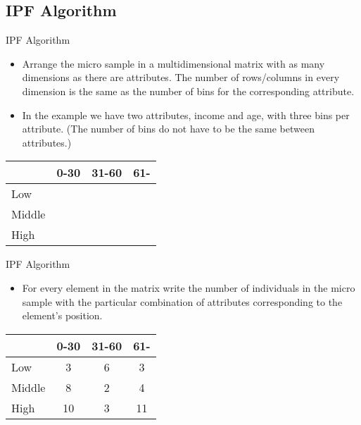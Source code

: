 \documentclass{beamer}
\begin{document}
\subsection{IPF Algorithm}
\begin{frame}{IPF Algorithm}
\begin{itemize}
\item Arrange the micro sample in a multidimensional matrix with as
  many dimensions as there are attributes. The number of rows/columns
  in every dimension is the same as the number of bins for the
  corresponding attribute.
\item In the example we have two attributes, income and age, with
  three bins per attribute. (The number of bins do not have to be the
  same between attributes.)
\end{itemize}

\begin{table}
\centering
\begin{tabular}{l||c c c}
      & 0-30 & 31-60 & 61-\\
\hline \hline
Low   & & & \\
Middle& & & \\
High  & & & \\
\end{tabular}
\end{table}
\end{frame}


\begin{frame}{IPF Algorithm}
\begin{itemize}
\item For every element in the matrix write the number of individuals
  in the micro sample with the particular combination of attributes
  corresponding to the element's position.
\end{itemize}

\begin{table}
\centering
\begin{tabular}{l||c c c}
      & 0-30 & 31-60 & 61- \\
\hline \hline
Low   &  3 &  6 &  3 \\
Middle&  8 &  2 &  4 \\
High  & 10 &  3 & 11 \\
\end{tabular}
\end{table}
\end{frame}
\end{document}
